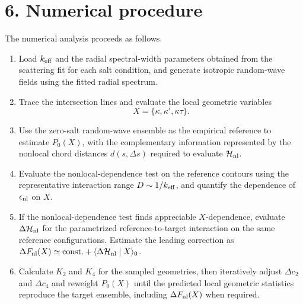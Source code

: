 \documentclass[11pt]{article}
\begin{document}
\section*{6. Numerical procedure}

The numerical analysis proceeds as follows.

\begin{enumerate}

\item Load \(k_{\rm eff}\) and the radial spectral-width parameters obtained from the scattering fit for each salt condition, and generate isotropic random-wave fields using the fitted radial spectrum.

\item Trace the intersection lines and evaluate the local geometric variables
\begin{equation}
X=
\{\kappa,\kappa',\kappa\tau\}.
\end{equation}

\item Use the zero-salt random-wave ensemble as the empirical reference to estimate \(P_0(X)\), with the complementary information represented by the nonlocal chord distances \(d(s,\Delta s)\) required to evaluate \(\mathcal H_{\rm nl}\).

\item Evaluate the nonlocal-dependence test on the reference contours using the representative interaction range \(D\sim1/k_{\rm eff}\), and quantify the dependence of \(\epsilon_{\rm nl}\) on \(X\). 

\item If the nonlocal-dependence test finds appreciable \(X\)-dependence, evaluate \(\Delta\mathcal H_{\rm nl}\) for the parametrized reference-to-target interaction on the same reference configurations. Estimate the leading correction as \(\Delta F_{\rm nl}(X)\simeq\mathrm{const.}+\langle\Delta\mathcal H_{\rm nl}\mid X\rangle_0\).

\item Calculate \(K_2\) and \(K_4\) for the sampled geometries, then iteratively adjust \(\Delta c_2\) and \(\Delta c_4\) and reweight \(P_0(X)\) until the predicted local geometric statistics reproduce the target ensemble, including \(\Delta F_{\rm nl}(X)\) when required.

\end{enumerate}
\end{document}
